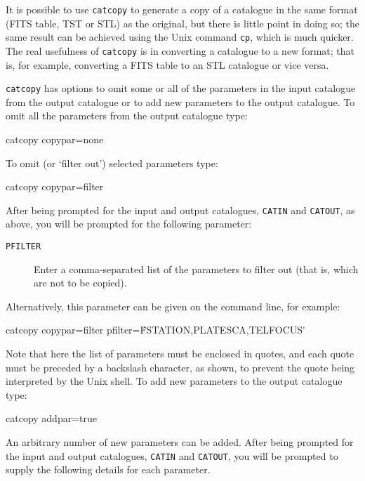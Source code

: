 \documentclass[twoside,11pt]{starlink}
\begin{document}
It is possible to use \texttt{catcopy} to generate a copy of a catalogue in
the same format (FITS table, TST or STL) as the original, but there
is little point in doing so; the same result can be achieved using the
Unix command \texttt{cp}, which is much quicker. The real usefulness of
\texttt{catcopy} is in converting a catalogue to a new format; that is,
for example, converting a FITS table to an STL catalogue or vice versa.

\texttt{catcopy} has options to omit some or all of the parameters in the
input catalogue from the output catalogue or to add new parameters to the
output catalogue.  To omit all the parameters from the output catalogue
type:

\begin{terminalv}
catcopy  copypar=none
\end{terminalv}

To omit (or `filter out') selected parameters type:

\begin{terminalv}
catcopy  copypar=filter
\end{terminalv}

After being prompted for the input and output catalogues, \texttt{CATIN} and
\texttt{CATOUT}, as above, you will be prompted for the following parameter:

\begin{description}

  \item[ \texttt{PFILTER} ] Enter a comma-separated list of the parameters to
   filter out (that is, which are not to be copied).

\end{description}

Alternatively, this parameter can be given on the command line, for
example:

\begin{terminalv}
catcopy  copypar=filter  pfilter=\'FSTATION,PLATESCA,TELFOCUS\'
\end{terminalv}

Note that here the list of parameters must be enclosed in quotes, and
each quote must be preceded by a backslash character, as shown, to prevent
the quote being interpreted by the Unix shell.  To add new parameters to
the output catalogue type:

\begin{terminalv}
catcopy  addpar=true
\end{terminalv}

An arbitrary number of new parameters can be added.  After being prompted
for the input and output catalogues, \texttt{CATIN} and \texttt{CATOUT}, you will
be prompted to supply the following details for each parameter.
\end{document}
